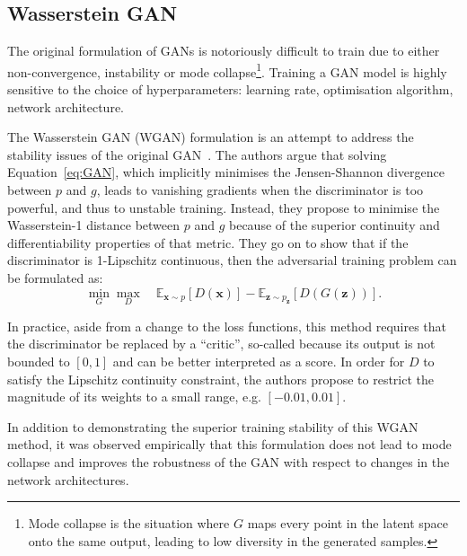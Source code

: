 \subsection{Wasserstein GAN}
The original formulation of GANs is notoriously difficult to train due to either
non-convergence, instability or mode collapse\footnote{Mode collapse is the
situation where $G$ maps every point in the latent space onto the same output,
leading to low diversity in the generated samples.}. Training a GAN model is
highly sensitive to the choice of hyperparameters: learning rate, optimisation
algorithm, network architecture.

The Wasserstein GAN (WGAN) formulation is an attempt to address the stability
issues of the original GAN~\cite{arjovsky2017wasserstein}. The authors argue
that solving Equation~\ref{eq:GAN}, which implicitly minimises the Jensen-Shannon
divergence between $p$ and $g$, leads to vanishing gradients when the
discriminator is too powerful, and thus to unstable training. Instead, they
propose to minimise the Wasserstein-1 distance between $p$ and $g$ because of
the superior continuity and differentiability properties of that metric. They go on to show
that if the discriminator is 1-Lipschitz continuous, then the adversarial
training problem can be formulated as:
\begin{equation}
    \min_G \max_D \quad
    \mathbb{E}_{\bm{x} \sim p} \left[ D(\bm{x}) \right] -
    \mathbb{E}_{\bm{z} \sim p_{\bm{z}}} \left[ D(G(\bm{z})) \right].
\end{equation}

In practice, aside from a change to the loss functions, this method requires
that the discriminator be replaced by a ``critic'', so-called because its output
is not bounded to $[0, 1]$ and can be better interpreted as a score. In order
for $D$ to satisfy the Lipschitz continuity constraint, the authors propose to
restrict the magnitude of its weights to a small range, e.g. $[-0.01, 0.01]$.

In addition to demonstrating the superior training stability of this WGAN
method, it was observed empirically that this formulation does not lead to mode
collapse and improves the robustness of the GAN with respect to changes in the
network architectures.

